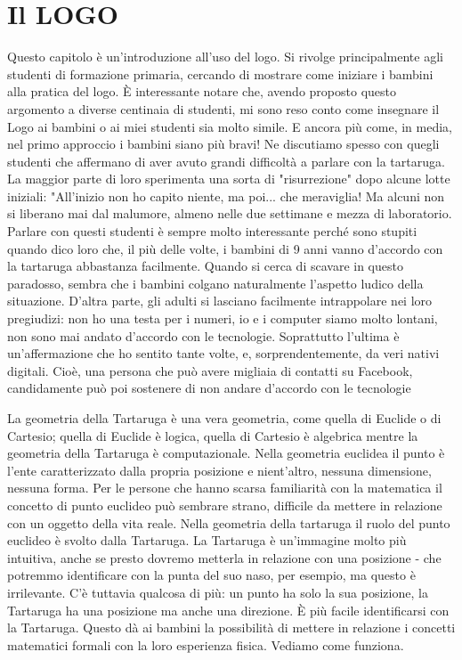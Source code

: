 \chapter{Il LOGO} \label{cap:papert2}

Questo capitolo è un'introduzione all'uso del logo. Si rivolge principalmente agli studenti di formazione primaria, cercando di mostrare come iniziare i bambini alla pratica del logo. È interessante notare che, avendo proposto questo argomento a diverse centinaia di studenti, mi sono reso conto come insegnare il Logo ai bambini o ai miei studenti sia molto simile. E ancora più come, in media, nel primo approccio i bambini siano più bravi! Ne discutiamo spesso con quegli studenti che affermano di aver avuto grandi difficoltà a parlare con la tartaruga. La maggior parte di loro sperimenta una sorta di "risurrezione" dopo alcune lotte iniziali: "All'inizio non ho capito niente, ma poi... che meraviglia!  Ma alcuni non si liberano mai dal malumore, almeno nelle due settimane e mezza di laboratorio. Parlare con questi studenti è sempre molto interessante perché sono stupiti quando dico loro che, il più delle volte, i bambini di 9 anni vanno d'accordo con la tartaruga abbastanza facilmente. Quando si cerca di scavare in questo paradosso, sembra che i bambini colgano naturalmente l'aspetto ludico della situazione. D'altra parte, gli adulti si lasciano facilmente intrappolare nei loro pregiudizi: non ho una testa per i numeri, io e i computer siamo molto lontani, non sono mai andato d'accordo con le tecnologie. Soprattutto l'ultima è un'affermazione che ho sentito tante volte, e, sorprendentemente, da veri nativi digitali. Cioè, una persona che può avere migliaia di contatti su Facebook, candidamente può poi sostenere di non andare d'accordo con le tecnologie

La geometria della Tartaruga è una vera geometria, come quella di Euclide o di Cartesio; quella di Euclide è logica, quella di Cartesio è 
algebrica mentre la geometria della Tartaruga è computazionale. Nella geometria euclidea il punto è l'ente caratterizzato dalla propria posizione e nient'altro, nessuna dimensione, nessuna forma. Per le persone che hanno scarsa familiarità con la matematica il concetto di punto euclideo può sembrare strano, difficile da mettere in relazione con un oggetto della vita reale. Nella geometria della tartaruga il ruolo del punto euclideo è svolto dalla Tartaruga. La Tartaruga è un'immagine molto più intuitiva, anche se presto dovremo metterla in relazione con una posizione - che potremmo identificare con la punta del suo naso, per esempio, ma questo è irrilevante. C'è tuttavia qualcosa di più: un punto ha solo la sua posizione, la Tartaruga ha una posizione ma anche una direzione. È più facile identificarsi con la Tartaruga. Questo dà ai bambini la possibilità di mettere in relazione i concetti matematici formali con la loro esperienza fisica. Vediamo come funziona.

